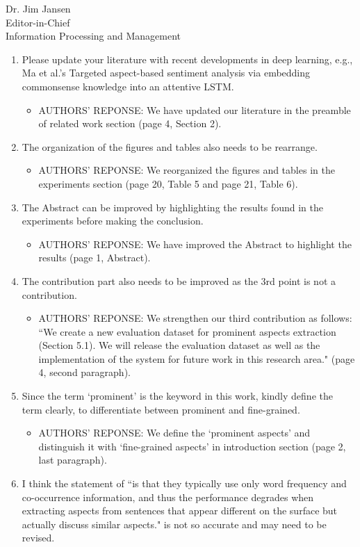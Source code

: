 \documentclass[11pt]{letter} %
\begin{document}
\begin{letter}{Dr. Jim Jansen \\
			Editor-in-Chief  \\
			Information Processing and Management}
		\flushleft
		\begin{enumerate}
			\item Please update your literature with recent developments in deep learning, e.g., Ma et al.'s Targeted aspect-based sentiment analysis via embedding commonsense knowledge into an attentive LSTM. 
			\begin{itemize}
				\item[] AUTHORS' REPONSE: We have updated our literature in the preamble of related work section (page 4, Section 2).
			\end{itemize}
			\item The organization of the figures and tables also needs to be rearrange.
			\begin{itemize}
				\item[] AUTHORS' REPONSE: We reorganized the figures and tables
				in the experiments section (page 20, Table 5 and page 21, Table 6).
			\end{itemize}
			\item The Abstract can be improved by highlighting the results found in the experiments before making the conclusion.
			\begin{itemize}
				\item[] AUTHORS' REPONSE: We have improved the Abstract to
				highlight the results (page 1, Abstract).
			\end{itemize}
			\item The contribution part also needs to be improved as the 3rd point is not a contribution.
			\begin{itemize}
				\item[] AUTHORS' REPONSE: We strengthen our third contribution as follows: ``We create a new evaluation dataset for prominent aspects extraction (Section 5.1). We will release the evaluation dataset as well as the implementation of the system for future work in this research area." (page 4, second paragraph).
			\end{itemize}
			\item Since the term `prominent' is the keyword in this work, kindly define the term clearly, to differentiate between prominent and fine-grained. 
			\begin{itemize}
				\item[] AUTHORS' REPONSE: We define the `prominent aspects' and
				distinguish it with `fine-grained aspects' in introduction section (page 2, last paragraph).
			\end{itemize}
			\item I think the statement of ``is that they typically use only word frequency and co-occurrence information, and thus the performance degrades when extracting aspects from sentences that appear different on the surface but actually discuss similar aspects." is not so accurate and may need to be revised.

\end{enumerate}
\end{letter}
\end{document}
